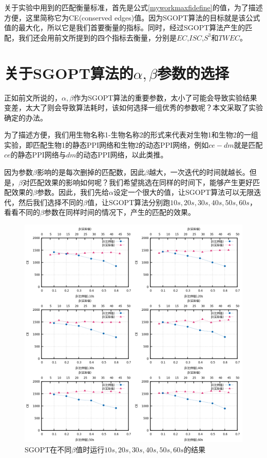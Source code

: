 关于实验中用到的匹配衡量标准，首先是公式\ref{myworkmaxfidefine}的值，为了描述方便，这里简称它为CE(conserved edges)值。因为SGOPT算法的目标就是该公式值的最大化，所以它是我们首要衡量的指标。同时，经过SGOPT算法产生的匹配，我们还会用前文所提到的四个指标去衡量，分别是$EC$,$ISC$,$S^3$和$TWEC$。

\section{关于SGOPT算法的$\alpha,\beta$参数的选择}

正如前文所说的，$\alpha,\beta$作为SGOPT算法的重要参数，太小了可能会导致实验结果变差，太大了则会导致算法耗时，该如何选择一组优秀的参数呢？本文采取了实验确定的办法。

为了描述方便，我们用生物名称1-生物名称2的形式来代表对生物1和生物2的一组实验，即匹配生物1的静态PPI网络和生物2的动态PPI网络，例如$ce-dm$就是匹配$ce$的静态PPI网络与$dm$的动态PPI网络，以此类推。

因为参数$\beta$影响的是每次删掉的匹配数，因此$\beta$越大，一次迭代的时间就越长。但是，$\beta$对匹配效果的影响如何呢？我们希望挑选在同样的时间下，能够产生更好匹配效果的$\beta$参数。因此，我们先给$\alpha$设定一个很大的值，让SGOPT算法可以无限迭代，然后我们选择不同的$\beta$值，让SGOPT算法分别跑$10s,20s,30s,40s,50s,60s$，看看不同的$\beta$参数在同样时间的情况下，产生的匹配的效果。
\begin{figure}[htbp]
\centering
\includegraphics[width=\textwidth]{pic/beta.png}
\caption{SGOPT在不同$\beta$值时运行$10s,20s,30s,40s,50s,60s$的结果} 
\label{fig:beta}
\end{figure}

